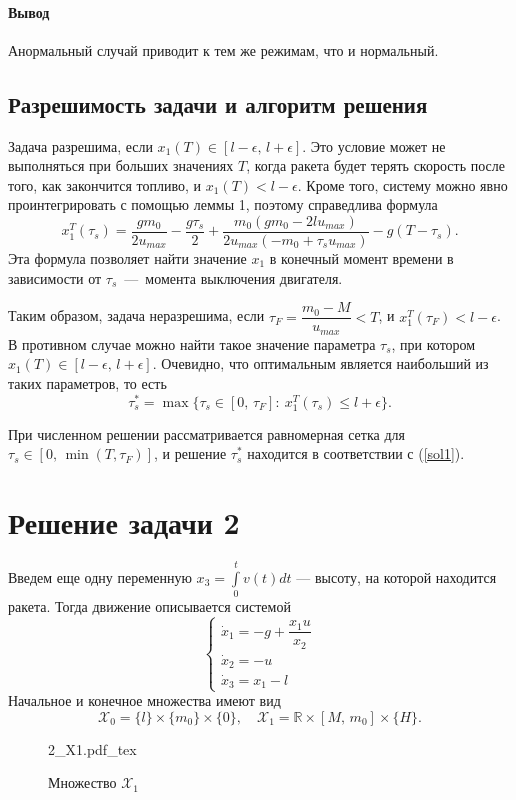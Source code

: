 \documentclass[16pt]{article}
\newcommand{\incfig}[2]{%
    \def\svgwidth{#2 mm}
    {#1.pdf_tex}
}
\newcommand\Real{\mathbb{R}}
\newcommand\Int[2]{\int\limits_{#1}^{#2}}
\newcommand\X{\mathcal{X}}
\newcommand\Pict[3]{
\begin{figure}[h!]
    \centering
    \incfig{#1}{#3}
    \caption{#2}
    \label{fig:#1}
\end{figure}
}
\begin{document}
\paragraph{Вывод}
Анормальный случай приводит к тем же режимам, что и нормальный.
\subsection{Разрешимость задачи и алгоритм решения}
Задача разрешима, если $x_1(T) \in [l - \epsilon,\, l + \epsilon]$. Это условие может не выполняться при больших 
значениях $T$, когда ракета будет терять скорость после того, как закончится топливо, и $x_1(T) < l - \epsilon$.
Кроме того, систему можно явно проинтегрировать с помощью леммы 1, поэтому справедлива формула
$$x_{1}^T(\tau_s) = \dfrac{gm_0}{2u_{max}} - \dfrac{g\tau_s}{2} +
 \dfrac{m_0(gm_0 - 2lu_{max})}{2u_{max}(-m_0 + \tau_su_{max})} - g(T - \tau_s).$$
Эта формула позволяет найти значение $x_1$ в конечный момент времени в зависимости от
$\tau_s$~---~момента выключения двигателя.

Таким образом, задача неразрешима, если $\tau_F = \dfrac{m_0 - M}{u_{max}} < T$, и
$x_{1}^T(\tau_F) < l - \epsilon$. В противном случае можно найти такое значение параметра $\tau_s$, при котором
$x_1(T) \in [l - \epsilon,\,l+\epsilon].$ Очевидно, что оптимальным является наибольший из таких параметров, то есть
\begin{equation} \label{sol1}
\tau_s^* = \max\{\tau_s \in [0,\, \tau_F]\colon\  x_1^T(\tau_s) \leqslant l + \epsilon\}.
\end{equation}

При численном решении рассматривается равномерная сетка для $\tau_s \in [0,\,\min(T, \tau_F)]$, и решение 
$\tau_s^*$ находится в соответствии с (\ref{sol1}).
\section{Решение задачи 2}
Введем еще одну переменную $x_3 = \Int{0}{t}v(t)dt$ --- высоту, на которой находится ракета.
 Тогда движение описывается системой
\begin{equation}
\begin{cases} \label{rocket_ode2}
\dot{x}_1 = -g + \dfrac{x_1u}{x_2} \\
\dot{x}_2 = -u \\
\dot{x}_3 = x_1 - l
\end{cases} 
\end{equation}
Начальное и конечное множества имеют вид
$$\X_0 =\{l\}\times\{m_0\}\times\{0\}, \quad \X_1 = \Real \times [M,\,m_0] \times \{H\}.$$
\Pict{2_X1}{Множество $\X_1$}{90}
\end{document}
